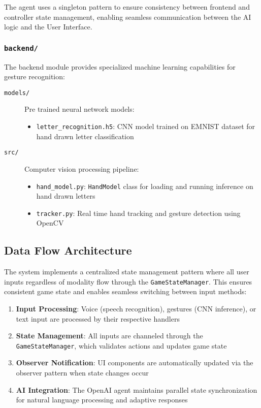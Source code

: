 The agent uses a singleton pattern to ensure consistency between frontend and controller state management, enabling seamless communication between the AI logic and the User Interface.

\subsubsection*{\texttt{backend/}}
The backend module provides specialized machine learning capabilities for gesture recognition:

\begin{description}
\item[\texttt{models/}] Pre trained neural network models:
  \begin{itemize}
    \item \texttt{letter\_recognition.h5}: CNN model trained on EMNIST dataset for hand drawn letter classification
  \end{itemize}
\item[\texttt{src/}] Computer vision processing pipeline:
  \begin{itemize}
    \item \texttt{hand\_model.py}: \texttt{HandModel} class for loading and running inference on hand drawn letters
    \item \texttt{tracker.py}: Real time hand tracking and gesture detection using OpenCV
  \end{itemize}
\end{description}

\subsection*{Data Flow Architecture}

The system implements a centralized state management pattern where all user inputs regardless of modality flow through the \texttt{GameStateManager}. This ensures consistent game state and enables seamless switching between input methods:

\begin{enumerate}
\item \textbf{Input Processing}: Voice (speech recognition), gestures (CNN inference), or text input are processed by their respective handlers
\item \textbf{State Management}: All inputs are channeled through the \texttt{GameStateManager}, which validates actions and updates game state
\item \textbf{Observer Notification}: UI components are automatically updated via the observer pattern when state changes occur
\item \textbf{AI Integration}: The OpenAI agent maintains parallel state synchronization for natural language processing and adaptive responses
\end{enumerate}

